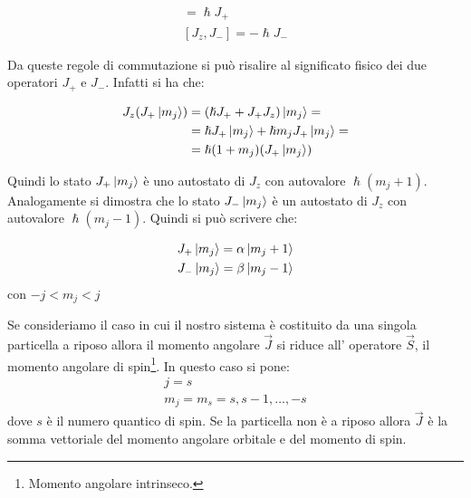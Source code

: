 \begin{gather}
[J_z,J_+]=\hslash J_+ \\
[J_z,J_-]=-\hslash J_-
\end{gather}

Da queste regole di commutazione si può risalire al significato fisico dei due
operatori $J_+$ e $J_-$. Infatti si ha che:

\begin{equation}
\begin{split}
J_z(J_+\ket{m_j}) &= (\hslash J_++J_+J_z)\ket{m_j}=\\
& = \hslash J_+\ket{m_j}+\hslash m_j J_+\ket{m_j}=\\
& = \hslash(1+m_j)(J_+\ket{m_j})
\end{split}
\end{equation}

Quindi lo stato $J_+\ket{m_j}$ è uno autostato di $J_z$ con autovalore $\hslash
(m_j+1)$. Analogamente si dimostra che lo stato $J_-\ket{m_j}$ è un autostato 
di
$J_z$ con autovalore $\hslash(m_j-1)$. Quindi si può scrivere che:

\begin{gather}
J_+\ket{m_j}= \alpha \ket{m_j+1} \\
J_-\ket{m_j}= \beta \ket{m_j-1}
\end{gather}
con $-j<m_j<j$

Se consideriamo il caso in cui il nostro sistema è costituito da una singola
particella a riposo allora il momento angolare $\vec{J}$ si riduce all'
operatore $\vec{S}$, il momento
angolare di spin\footnote{Momento angolare intrinseco. }. In questo caso si
pone:
\begin{gather}
j=s \\
m_j=m_s=s,s-1,\dots,-s
\end{gather}
dove $s$ è il numero quantico di spin. Se la particella non è a riposo allora
$\vec{J}$ è la somma vettoriale del momento angolare orbitale e del momento di
spin.
